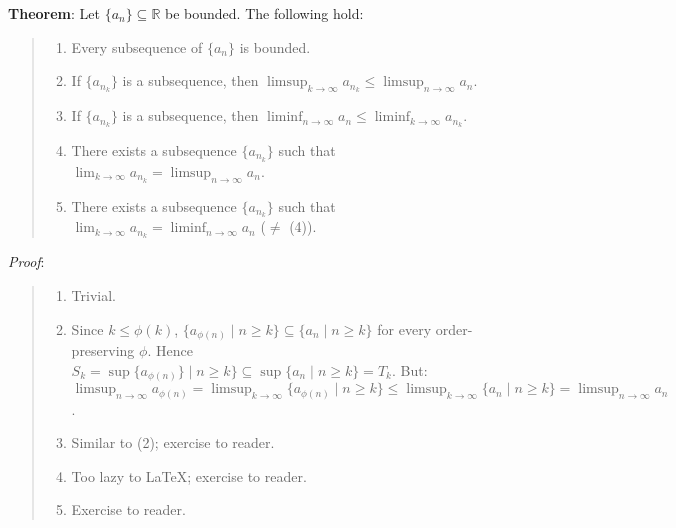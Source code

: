 \documentclass[11pt]{article}
\begin{document}
\textbf{Theorem}: Let $\{a_n\} \subseteq \mathbb{R}$ be bounded. The following hold:
\begin{quote}\vspace{-0.3cm}
	\begin{enumerate}
	\item Every subsequence of $\{a_n\}$ is bounded.
	\item If $\{a_{n_k}\}$ is a subsequence, then $\limsup_{k \to \infty} a_{n_k} \leq \limsup_{n \to \infty} a_n$.
	\item If $\{a_{n_k}\}$ is a subsequence, then $\liminf_{n \to \infty} a_n \leq \liminf_{k \to \infty} a_{n_k}$.
	\item There exists a subsequence $\{a_{n_k}\}$ such that $\lim_{k \to \infty} a_{n_k} = \limsup_{n \to \infty} a_n$.
	\item There exists a subsequence $\{a_{n_k}\}$ such that $\lim_{k \to \infty} a_{n_k} = \liminf_{n \to \infty} a_n$ ($\neq$ (4)).
	\end{enumerate}
\end{quote}

\emph{Proof}:
\begin{quote}\vspace{-0.3cm}
	\begin{enumerate}
	\item Trivial.
	\item Since $k \leq \phi(k)$, $\{a_{\phi(n)} \mid n \geq k\} \subseteq \{a_n \mid n \geq k\}$ for every order-preserving $\phi$. Hence $S_k = \sup \{a_{\phi(n)}\} \mid n \geq k\} \subseteq \sup \{a_n \mid n \geq k\} = T_k$. But:\\
	$\limsup_{n \to \infty} a_{\phi(n)} = \limsup_{k \to \infty} \{a_{\phi(n)} \mid n \geq k\} \leq \limsup_{k \to \infty} \{a_n \mid n \geq k\} = \limsup_{n \to \infty} a_n$.
	\item Similar to (2); exercise to reader.
	\item Too lazy to \LaTeX; exercise to reader. %
	\item Exercise to reader.
	\end{enumerate}
\end{quote}
\end{document}
